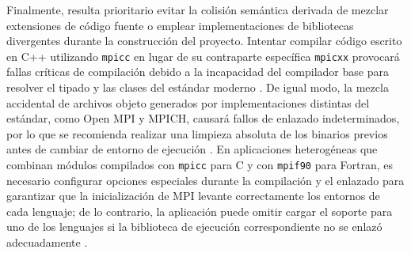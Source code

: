 Finalmente, resulta prioritario evitar la colisión semántica derivada de mezclar extensiones de código fuente o emplear implementaciones de bibliotecas divergentes durante la construcción del proyecto. Intentar compilar código escrito en C++ utilizando \texttt{mpicc} en lugar de su contraparte específica \texttt{mpicxx} provocará fallas críticas de compilación debido a la incapacidad del compilador base para resolver el tipado y las clases del estándar moderno \cite{open_mpi_2026}. De igual modo, la mezcla accidental de archivos objeto generados por implementaciones distintas del estándar, como Open MPI y MPICH, causará fallos de enlazado indeterminados, por lo que se recomienda realizar una limpieza absoluta de los binarios previos antes de cambiar de entorno de ejecución \cite{mpi_forum_2025}. En aplicaciones heterogéneas que combinan módulos compilados con \texttt{mpicc} para C y con \texttt{mpif90} para Fortran, es necesario configurar opciones especiales durante la compilación y el enlazado para garantizar que la inicialización de MPI levante correctamente los entornos de cada lenguaje; de lo contrario, la aplicación puede omitir cargar el soporte para uno de los lenguajes si la biblioteca de ejecución correspondiente no se enlazó adecuadamente \cite{mpi_forum_2025}.

